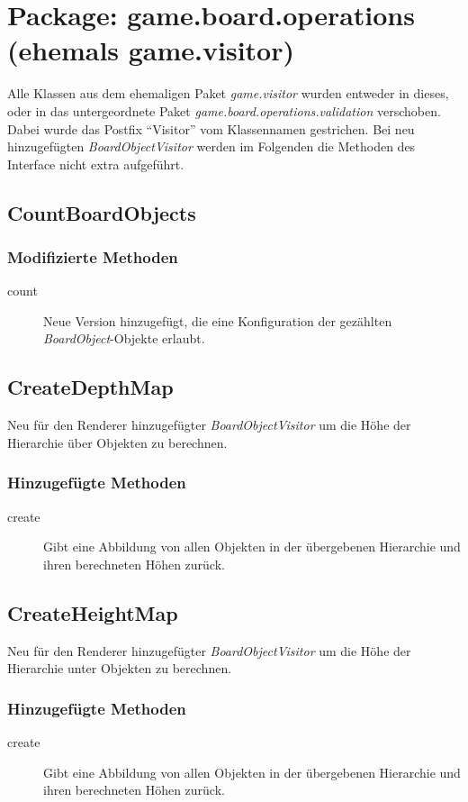 \section{Package: game.board.operations (ehemals game.visitor)}
Alle Klassen aus dem ehemaligen Paket \emph{game.visitor} wurden entweder in dieses, oder in das untergeordnete Paket \emph{game.board.operations.validation} verschoben.
Dabei wurde das Postfix "`Visitor"' vom Klassennamen gestrichen.
Bei neu hinzugefügten \emph{BoardObjectVisitor} werden im Folgenden die Methoden des Interface nicht extra aufgeführt.

\subsection{CountBoardObjects}

\subsubsection{Modifizierte Methoden}
\begin{description}
\item[count]
Neue Version hinzugefügt, die eine Konfiguration der gezählten \emph{BoardObject}-Objekte erlaubt.
\end{description}


\subsection{CreateDepthMap}
Neu für den Renderer hinzugefügter \emph{BoardObjectVisitor} um die Höhe der Hierarchie über Objekten zu berechnen.

\subsubsection{Hinzugefügte Methoden}
\begin{description}
\item[create]
Gibt eine Abbildung von allen Objekten in der übergebenen Hierarchie und ihren berechneten Höhen zurück.
\end{description}


\subsection{CreateHeightMap}
Neu für den Renderer hinzugefügter \emph{BoardObjectVisitor} um die Höhe der Hierarchie unter Objekten zu berechnen.

\subsubsection{Hinzugefügte Methoden}
\begin{description}
\item[create]
Gibt eine Abbildung von allen Objekten in der übergebenen Hierarchie und ihren berechneten Höhen zurück.
\end{description}


